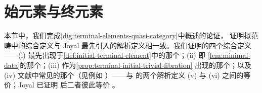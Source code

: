 
\providecommand{\sSet}{s\mathcal{S}et}%

\section{始元素与终元素}\label{sec:f-initial-and-terminal-elements}

本节中，我们完成\cref{dig:terminal-elements-quasi-category}中概述的论证，%
证明拟范畴中\trTerminal{}\trElement{}的综合定义与 Joyal \cite[4.1]{bib61}%
最先引入的解析定义相一致。我们证明\trTerminal{}\trElement{}的四个综合定义%
——(i) 最先出现于\cref{def:initial-terminal-element}中的那个；(ii) 即%
\cref{lem:minimal-data}的那个；(iii) 作为\cref{prop:terminal-initial-trivial-fibration}%
出现的那个；以及 (iv) 文献中常见的那个（见例如 \cite{bib88}）——与%
\trTerminal{}\trElement{}的两个解析定义 (v) 与 (vi) 之间的等价；Joyal 已证明%
后二者彼此等价 \cite[4.2]{bib61}。

